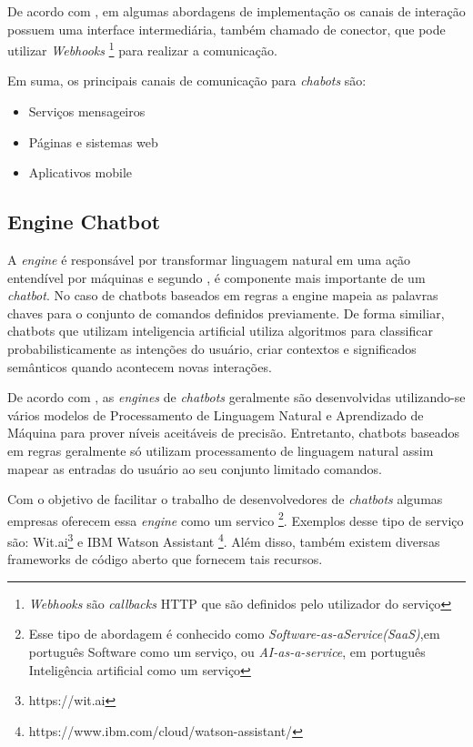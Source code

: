 De acordo com , em algumas abordagens de implementação os canais de interação possuem uma interface intermediária, também chamado de conector, que pode utilizar \textit{Webhooks} \footnote{\textit{Webhooks} são \textit{callbacks} HTTP que são definidos pelo utilizador do serviço} para realizar a comunicação.

Em suma, os principais canais de comunicação para \textit{chabots} são:

\begin{itemize}
    \item Serviços mensageiros
    \item Páginas e sistemas web
    \item Aplicativos mobile
\end{itemize}



\subsection{Engine Chatbot}



A \textit{engine} é responsável por transformar linguagem natural em uma ação entendível por máquinas e segundo , é componente mais importante de um \textit{chatbot}. No caso de chatbots baseados em regras a engine mapeia as palavras chaves para o conjunto de comandos definidos previamente. De forma similiar, chatbots que utilizam inteligencia artificial utiliza algoritmos para classificar probabilisticamente as intenções do usuário, criar contextos e significados semânticos quando acontecem novas interações.

De acordo com , as \textit{engines} de \textit{chatbots} geralmente são desenvolvidas utilizando-se vários modelos de Processamento de Linguagem Natural e Aprendizado de Máquina para prover níveis aceitáveis de precisão.  Entretanto, chatbots baseados em regras geralmente só utilizam processamento de linguagem natural assim mapear as entradas do usuário ao seu conjunto limitado comandos.

Com o objetivo de facilitar o trabalho de desenvolvedores de \textit{chatbots} algumas empresas oferecem essa \textit{engine} como um servico \footnote{Esse tipo de abordagem é conhecido como \textit{Software-as-aService(SaaS)},em português Software como um serviço, ou \textit{AI-as-a-service}, em português Inteligência artificial como um serviço }. Exemplos desse tipo de serviço são: Wit.ai\footnote{https://wit.ai} e IBM Watson Assistant \footnote{https://www.ibm.com/cloud/watson-assistant/}. Além disso, também existem diversas frameworks de código aberto que fornecem tais recursos.


